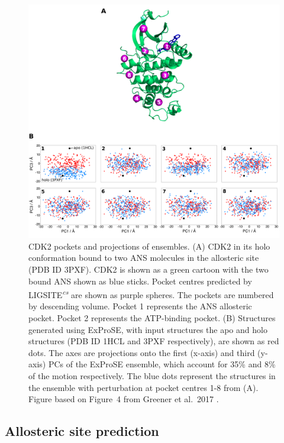 \begin{figure}
\centering

\includegraphics[width=\textwidth]{figures/cdk2_exprose/cdk2_exprose}

\caption[CDK2 pockets and projections of perturbed ExProSE ensembles]
{CDK2 pockets and projections of ensembles.
(A) CDK2 in its holo conformation bound to two ANS molecules in the allosteric site (PDB ID 3PXF).
CDK2 is shown as a green cartoon with the two bound ANS shown as blue sticks.
Pocket centres predicted by LIGSITE\textsuperscript{\it cs} are shown as purple spheres.
The pockets are numbered by descending volume.
Pocket 1 represents the ANS allosteric pocket.
Pocket 2 represents the ATP-binding pocket.
(B) Structures generated using ExProSE, with input structures the apo and holo structures (PDB ID 1HCL and 3PXF respectively), are shown as red dots.
The axes are projections onto the first (x-axis) and third (y-axis) PCs of the ExProSE ensemble, which account for 35\% and 8\% of the motion respectively.
The blue dots represent the structures in the ensemble with perturbation at pocket centres 1-8 from (A).
Figure based on Figure~4 from Greener et al.\ 2017 \cite{Greener2017}.}

\label{fig:cdk2_exprose}
\end{figure}


\subsection{Allosteric site prediction}

